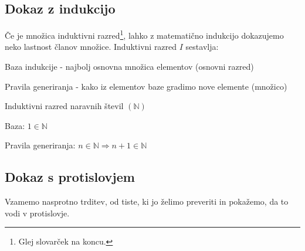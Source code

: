 \documentclass[10pt,a4paper,oneside]{book}
\begin{document}
\subsection{Dokaz z indukcijo}
Če je množica induktivni razred\footnote{Glej slovarček na koncu.}, lahko z matematično indukcijo dokazujemo neko lastnost članov množice.
\br
Induktivni razred $I$ sestavlja:
\begin{items}
\item Baza indukcije - najbolj osnovna množica elementov (osnovni razred)
\item Pravila generiranja - kako iz elementov baze gradimo nove elemente (množico)
\end{items}
\begin{primeri}
\item Induktivni razred naravnih števil $(\mathbb{N})$
	\begin{items}
	\item Baza: $1 \in \mathbb{N}$ 
	\item Pravila generiranja: $n \in \mathbb{N} \Longrightarrow n+1 \in \mathbb{N} $
	\end{items}
\item {}
\end{primeri}

\subsection{Dokaz s protislovjem}
Vzamemo nasprotno trditev, od tiste, ki jo želimo preveriti in pokažemo, da to vodi v protislovje.
\end{document}
